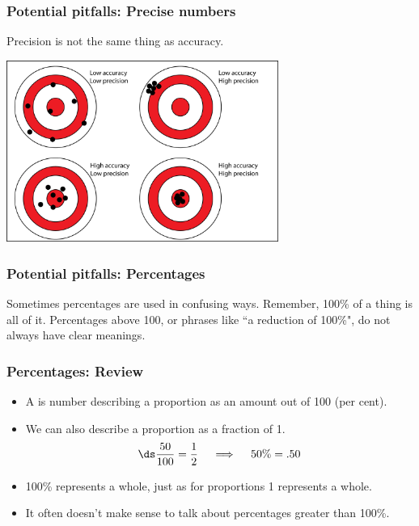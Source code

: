 \documentclass[xcolor=table]{beamer}
\begin{document}
\begin{frame}
\frametitle{Potential pitfalls: Precise numbers}

\begin{block}{}
Precision is not the same thing as accuracy.
\end{block}

\begin{center}
\includegraphics[width=3.5in]{../images/precision_accuracy}
\end{center}
\end{frame}

\begin{frame}
\frametitle{Potential pitfalls: Percentages}

\begin{block}{}
Sometimes percentages are used in confusing ways. Remember, 100\% of a thing is all of it. Percentages above 100, or phrases like ``a reduction of 100\%", do not always have clear meanings. 
\end{block}


\end{frame}

\begin{frame}
\frametitle{Percentages: Review}

\begin{block}{}
\begin{itemize}
\item A  is number describing a proportion as an amount out of 100 (per cent).
\pause
\item We can also describe a proportion as a fraction of 1.
\[\ds \frac {50}{100} = \frac 1 2 \quad \implies \quad 50\% = .50\]
\pause
\item 100\% represents a whole, just as for proportions 1 represents a whole.
\pause
\item It often doesn't make sense to talk about percentages greater than 100\%.
\end{itemize}
\end{block}
\end{frame}
\end{document}
